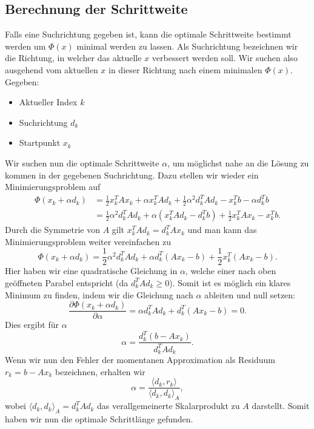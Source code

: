 \subsection{Berechnung der Schrittweite \label{cg:subsection:schrittweite}}
Falls eine Suchrichtung gegeben ist, kann die optimale Schrittweite bestimmt werden um $\Phi(x)$ minimal werden zu lassen.
Als Suchrichtung bezeichnen wir die Richtung, in welcher das aktuelle $x$ verbessert werden soll.
Wir suchen also ausgehend vom aktuellen $x$ in dieser Richtung nach einem minimalen $\Phi(x)$.
Gegeben: 
\begin{itemize}
	\item Aktueller Index $k$
	\item Suchrichtung $d_k$
	\item Startpunkt $x_k$
\end{itemize}
Wir suchen nun die optimale Schrittweite $\alpha$, um möglichst nahe an die Lösung zu kommen in der gegebenen Suchrichtung.
Dazu stellen wir wieder ein Minimierungsproblem auf
\begin{align}
	\Phi(x_k + \alpha d_k) 
	&= 
	\frac{1}{2} x_k^T A x_k + \alpha x_k^T A d_k + \frac{1}{2} {\alpha}^2 d_k^T A d_k
	-
	x_k^T b - \alpha d_k^T b \\
	&= \frac{1}{2} {\alpha}^2 d_k^T A d_k + \alpha \left( x_k^T A d_k - d_k^T b \right) + \frac{1}{2} x_k^T A x_k -	x_k^T b.
\end{align}
Durch die Symmetrie von $A$ gilt $x_k^T A d_k = d_k^T A x_k$ und man kann das Minimierungsproblem weiter vereinfachen zu
\begin{equation}
	\Phi(x_k + \alpha d_k) = \frac{1}{2} {\alpha}^2 d_k^T A d_k + \alpha d_k^T\left( A x_k - b \right) + \frac{1}{2} x_k^T \left( A x_k - b \right).
\end{equation}
Hier haben wir eine quadratische Gleichung in $\alpha$, welche einer nach oben geöffneten Parabel entspricht (da $d_k^T A d_k \ge 0$).
Somit ist es möglich ein klares Minimum zu finden, indem wir die Gleichung nach $\alpha$ ableiten und null setzen:
\begin{equation}
	\frac{\partial \Phi(x_k + \alpha d_k) }{\partial \alpha}
	= 
	\alpha  d_k^T A d_k + d_k^T\left( A x_k - b \right)
	=
	0 .
\end{equation}
Dies ergibt für $\alpha$ 
\begin{equation}
	\alpha
	=
	\frac{d_k^T \left(b - A x_k\right)}{d_k^T A d_k}.
\end{equation}
Wenn wir nun den Fehler der momentanen Approximation als Residuum $r_k = b - A x_k$ bezeichnen, erhalten wir
\begin{equation}
	\alpha
	= 
	\frac{\langle d_k , r_k \rangle}{\langle d_k , d_k \rangle_A},
\end{equation}
wobei $\langle d_k , d_k \rangle_A = d_k^T A d_k$ das verallgemeinerte Skalarprodukt zu $A$ darstellt.
Somit haben wir nun die optimale Schrittlänge gefunden.


